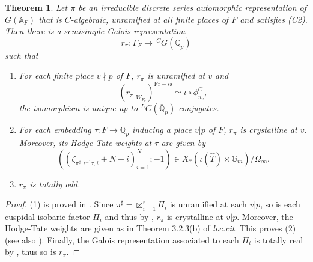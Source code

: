 \documentclass[12pt,oneside,reqno]{amsart}
\newcommand{\G}{\mathbb{G}}
\newcommand{\Q}{\mathbb{Q}}
\theoremstyle{plain}
\newtheorem{theorem}{Theorem}[section]
\begin{document}
	
	\begin{theorem}\label{Galois representations attached to auto rep}
		Let $\pi$ be an irreducible discrete series automorphic representation of $G(\mathbb{A}_F)$ that is $C$-algebraic, unramified at all finite places of $F$ and satisfies (C2).
		Then there is a semisimple Galois representation
		\[
		r_{\pi}
		\colon
		\Gamma_F\to\,^CG(\overline{\mathbb{Q}}_p)
		\]
		such that
		\begin{enumerate}
			\item For each finite place $v\nmid p$ of $F$, $r_\pi$ is unramified at $v$ and 
			\[
			(r_\pi|_{W_{F_v}})^{\mathrm{Fr}-\mathrm{ss}}\simeq\iota\circ\phi_{\pi_v}^C,
			\]
			the isomorphism is unique up to $^LG(\overline{\mathbb{Q}}_p)$-conjugates.
			
			
			\item For each embedding $\tau\colon F\to\overline{\Q}_p$ inducing a place $v|p$ of $F$, $r_\pi$ is crystalline at $v$. Moreover, its Hodge-Tate weights at $\tau$ are given by
			\begin{equation}\label{Hodge-Tate weights of r_pi}
				\left(
				(\zeta_{\pi^\sharp,\iota^{-1}\tau,i}+N-i)_{i=1}^N;-1
				\right)
				\in
				X_\ast(\iota(\widehat{T})\times\G_m)/\Omega_\infty.
			\end{equation}
			
			
			
			
			
			\item $r_\pi$ is totally odd.
		\end{enumerate}
	\end{theorem}
	\begin{proof}
		(1) is proved in \cite[Theorem 3.2.7]{Shin2024}. Since $\pi^\sharp=\boxtimes_{i=1}^r\Pi_i$ is unramified at each $v|p$, so is each cuspidal isobaric factor $\Pi_i$ and thus by \cite[Theorem 3.2.3(c)]{ChenevierHarris2013}, $r_\pi$ is crystalline at $v|p$. Moreover, the Hodge-Tate weights are given as in Theorem 3.2.3(b) of \emph{loc.cit}. This proves (2) (see also \cite[Theorem 2.1.1]{Barnet-LambGeeGeraghtyTaylor2014}). Finally, the Galois representation associated to each $\Pi_i$ is totally real by \cite{Taylor2012,Taibi2016,CaraianiLeHung2016}, thus so is $r_\pi$.
	\end{proof}
	
	
	
	
	
	
	
	
	
	
	
\end{document}
